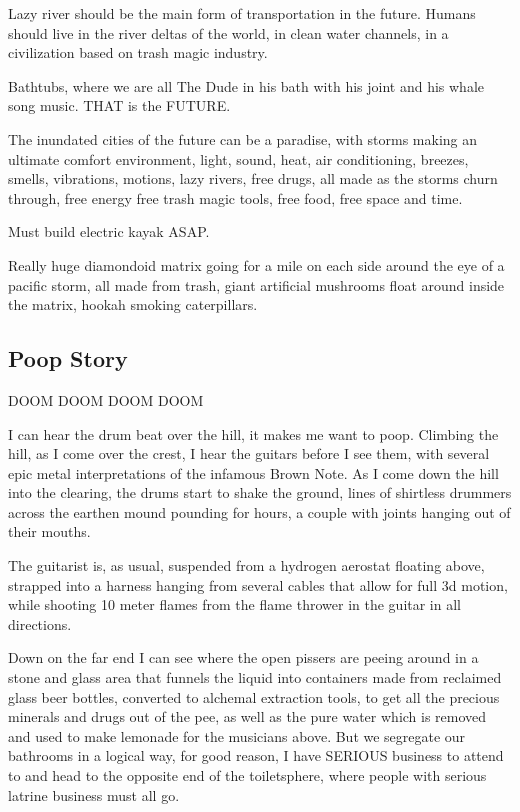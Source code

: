Lazy river should be the main form of transportation in the future.
Humans should live in the river deltas of the world, in clean water
channels, in a civilization based on trash magic industry.

Bathtubs, where we are all The Dude in his bath with his joint and his
whale song music. THAT is the FUTURE.

The inundated cities of the future can be a paradise, with storms making
an ultimate comfort environment, light, sound, heat, air conditioning,
breezes, smells, vibrations, motions, lazy rivers, free drugs, all made
as the storms churn through, free energy free trash magic tools, free
food, free space and time.

Must build electric kayak ASAP.

Really huge diamondoid matrix going for a mile on each side around the
eye of a pacific storm, all made from trash, giant artificial mushrooms
float around inside the matrix, hookah smoking caterpillars.

\subsection{Poop Story}\label{poop-story}

DOOM DOOM DOOM DOOM

I can hear the drum beat over the hill, it makes me want to poop.
Climbing the hill, as I come over the crest, I hear the guitars before I
see them, with several epic metal interpretations of the infamous Brown
Note. As I come down the hill into the clearing, the drums start to
shake the ground, lines of shirtless drummers across the earthen mound
pounding for hours, a couple with joints hanging out of their mouths.

The guitarist is, as usual, suspended from a hydrogen aerostat floating
above, strapped into a harness hanging from several cables that allow
for full 3d motion, while shooting 10 meter flames from the flame
thrower in the guitar in all directions.

Down on the far end I can see where the open pissers are peeing around
in a stone and glass area that funnels the liquid into containers made
from reclaimed glass beer bottles, converted to alchemal extraction
tools, to get all the precious minerals and drugs out of the pee, as
well as the pure water which is removed and used to make lemonade for
the musicians above. But we segregate our bathrooms in a logical way,
for good reason, I have SERIOUS business to attend to and head to the
opposite end of the toiletsphere, where people with serious latrine
business must all go.

